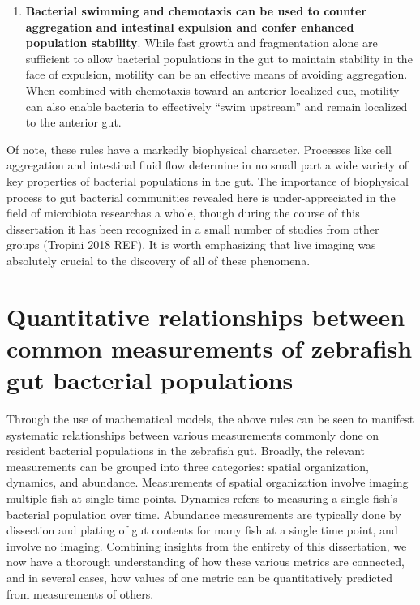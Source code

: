 \begin{enumerate}
\item 
\textbf{Bacterial swimming and chemotaxis can be used to counter aggregation and intestinal expulsion and confer enhanced population stability}. While fast growth and fragmentation alone are sufficient to allow bacterial populations in the gut to maintain stability in the face of expulsion, motility can be an effective means of avoiding aggregation. When combined with chemotaxis toward an anterior-localized cue, motility can also enable bacteria to effectively ``swim upstream'' and remain localized to the anterior gut.

\end{enumerate}
Of note, these rules have a markedly biophysical character. Processes like cell aggregation and intestinal fluid flow determine in no small part a wide variety of key properties of bacterial populations in the gut. The importance of biophysical process to gut bacterial communities revealed here is under-appreciated in the field of microbiota researchas a whole, though during the course of this dissertation it has been recognized in a small number of studies from other groups \cite{cremer_effect_2016,moor_high-avidity_2017} (Tropini 2018 REF). It is worth emphasizing that live imaging was absolutely crucial to the discovery of all of these phenomena.

\section{Quantitative relationships between common measurements of zebrafish gut bacterial populations}

Through the use of mathematical models, the above rules can be seen to manifest systematic relationships between various measurements commonly done on resident bacterial populations in the zebrafish gut. Broadly, the relevant measurements can be grouped into three categories: spatial organization, dynamics, and abundance. Measurements of spatial organization involve imaging multiple fish at single time points. Dynamics refers to measuring a single fish's bacterial population over time. Abundance measurements are typically done by dissection and plating of gut contents for many fish at a single time point, and involve no imaging. Combining insights from the entirety of this dissertation, we now have a thorough understanding of how these various metrics are connected, and in several cases, how values of one metric can be quantitatively predicted from measurements of others.


